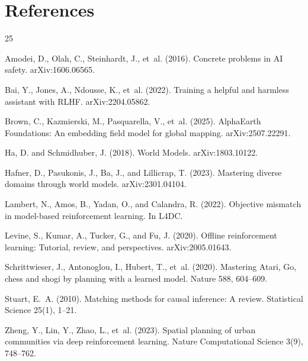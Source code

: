\documentclass[11pt]{article}
\begin{document}
\section*{References}

\begin{thebibliography}{25}

Amodei, D., Olah, C., Steinhardt, J., et~al. (2016).
Concrete problems in AI safety. arXiv:1606.06565.

Bai, Y., Jones, A., Ndousse, K., et~al. (2022).
Training a helpful and harmless assistant with RLHF. arXiv:2204.05862.

Brown, C., Kazmierski, M., Pasquarella, V., et~al. (2025).
AlphaEarth Foundations: An embedding field model for global mapping. arXiv:2507.22291.

Ha, D. and Schmidhuber, J. (2018).
World Models. arXiv:1803.10122.

Hafner, D., Pasukonis, J., Ba, J., and Lillicrap, T. (2023).
Mastering diverse domains through world models. arXiv:2301.04104.

Lambert, N., Amos, B., Yadan, O., and Calandra, R. (2022).
Objective mismatch in model-based reinforcement learning. In L4DC.

Levine, S., Kumar, A., Tucker, G., and Fu, J. (2020).
Offline reinforcement learning: Tutorial, review, and perspectives. arXiv:2005.01643.

Schrittwieser, J., Antonoglou, I., Hubert, T., et~al. (2020).
Mastering Atari, Go, chess and shogi by planning with a learned model. Nature 588, 604--609.

Stuart, E.~A. (2010).
Matching methods for causal inference: A review. Statistical Science 25(1), 1--21.

Zheng, Y., Lin, Y., Zhao, L., et~al. (2023).
Spatial planning of urban communities via deep reinforcement learning. Nature Computational Science 3(9), 748--762.

\end{thebibliography}
\end{document}
